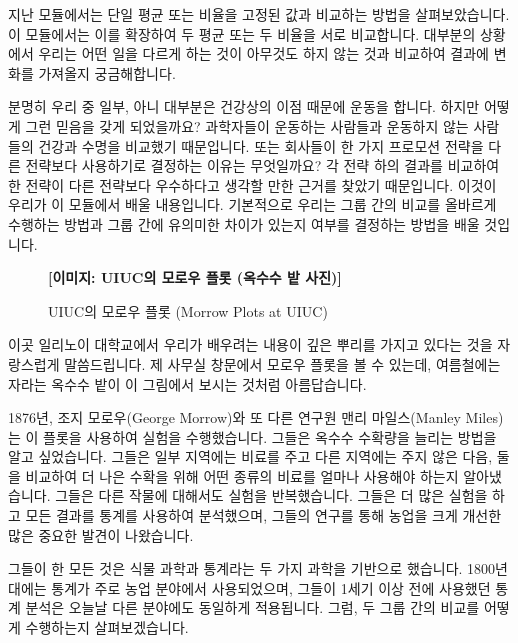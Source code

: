 \documentclass[11pt,a4paper]{article}
\begin{document}
지난 모듈에서는 단일 평균 또는 비율을 고정된 값과 비교하는 방법을 살펴보았습니다. 이 모듈에서는 이를 확장하여 두 평균 또는 두 비율을 서로 비교합니다. 대부분의 상황에서 우리는 어떤 일을 다르게 하는 것이 아무것도 하지 않는 것과 비교하여 결과에 변화를 가져올지 궁금해합니다.

분명히 우리 중 일부, 아니 대부분은 건강상의 이점 때문에 운동을 합니다. 하지만 어떻게 그런 믿음을 갖게 되었을까요? 과학자들이 운동하는 사람들과 운동하지 않는 사람들의 건강과 수명을 비교했기 때문입니다. 또는 회사들이 한 가지 프로모션 전략을 다른 전략보다 사용하기로 결정하는 이유는 무엇일까요? 각 전략 하의 결과를 비교하여 한 전략이 다른 전략보다 우수하다고 생각할 만한 근거를 찾았기 때문입니다. 이것이 우리가 이 모듈에서 배울 내용입니다. 기본적으로 우리는 그룹 간의 비교를 올바르게 수행하는 방법과 그룹 간에 유의미한 차이가 있는지 여부를 결정하는 방법을 배울 것입니다.

\begin{figure}[h!]
    \centering
    \textbf{[이미지: UIUC의 모로우 플롯 (옥수수 밭 사진)]}
    \caption{UIUC의 모로우 플롯 (Morrow Plots at UIUC)}
    \label{fig:morrow_plots}
\end{figure}
\begin{tcolorbox}[mybox, title=모로우 플롯: 1세기의 학습과 통계의 뿌리]
이곳 일리노이 대학교에서 우리가 배우려는 내용이 깊은 뿌리를 가지고 있다는 것을 자랑스럽게 말씀드립니다. 제 사무실 창문에서 모로우 플롯을 볼 수 있는데, 여름철에는 자라는 옥수수 밭이 이 그림에서 보시는 것처럼 아름답습니다.

1876년, 조지 모로우(George Morrow)와 또 다른 연구원 맨리 마일스(Manley Miles)는 이 플롯을 사용하여 실험을 수행했습니다. 그들은 옥수수 수확량을 늘리는 방법을 알고 싶었습니다. 그들은 일부 지역에는 비료를 주고 다른 지역에는 주지 않은 다음, 둘을 비교하여 더 나은 수확을 위해 어떤 종류의 비료를 얼마나 사용해야 하는지 알아냈습니다. 그들은 다른 작물에 대해서도 실험을 반복했습니다. 그들은 더 많은 실험을 하고 모든 결과를 통계를 사용하여 분석했으며, 그들의 연구를 통해 농업을 크게 개선한 많은 중요한 발견이 나왔습니다.

그들이 한 모든 것은 식물 과학과 통계라는 두 가지 과학을 기반으로 했습니다. 1800년대에는 통계가 주로 농업 분야에서 사용되었으며, 그들이 1세기 이상 전에 사용했던 통계 분석은 오늘날 다른 분야에도 동일하게 적용됩니다. 그럼, 두 그룹 간의 비교를 어떻게 수행하는지 살펴보겠습니다.
\end{tcolorbox}
\end{document}
